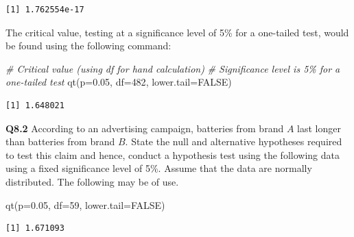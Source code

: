 \documentclass[
  oneside]{krantz}
\newenvironment{Shaded}{\begin{snugshade}}{\end{snugshade}}
\newcommand{\AttributeTok}[1]{\textcolor[rgb]{0.77,0.63,0.00}{#1}}
\newcommand{\CommentTok}[1]{\textcolor[rgb]{0.56,0.35,0.01}{\textit{#1}}}
\newcommand{\ConstantTok}[1]{\textcolor[rgb]{0.00,0.00,0.00}{#1}}
\newcommand{\DecValTok}[1]{\textcolor[rgb]{0.00,0.00,0.81}{#1}}
\newcommand{\FloatTok}[1]{\textcolor[rgb]{0.00,0.00,0.81}{#1}}
\newcommand{\FunctionTok}[1]{\textcolor[rgb]{0.00,0.00,0.00}{#1}}
\newcommand{\NormalTok}[1]{#1}
\begin{document}
\begin{verbatim}
[1] 1.762554e-17
\end{verbatim}

The critical value, testing at a significance level of 5\% for a one-tailed test, would be found using the following command:

\begin{Shaded}
\begin{Highlighting}[]
\CommentTok{\# Critical value (using df for hand calculation)}
\CommentTok{\# Significance level is 5\% for a one{-}tailed test}
\FunctionTok{qt}\NormalTok{(}\AttributeTok{p=}\FloatTok{0.05}\NormalTok{, }\AttributeTok{df=}\DecValTok{482}\NormalTok{, }\AttributeTok{lower.tail=}\ConstantTok{FALSE}\NormalTok{)}
\end{Highlighting}
\end{Shaded}

\begin{verbatim}
[1] 1.648021
\end{verbatim}

\textbf{Q8.2} According to an advertising campaign, batteries from brand \(A\) last longer than
batteries from brand \(B\). State the null and alternative hypotheses required to test this claim and hence, conduct a hypothesis test using the following data using a fixed significance level of 5\%. Assume that the data are normally distributed. The following may be of use.

\begin{Shaded}
\begin{Highlighting}[]
\FunctionTok{qt}\NormalTok{(}\AttributeTok{p=}\FloatTok{0.05}\NormalTok{, }\AttributeTok{df=}\DecValTok{59}\NormalTok{, }\AttributeTok{lower.tail=}\ConstantTok{FALSE}\NormalTok{)}
\end{Highlighting}
\end{Shaded}

\begin{verbatim}
[1] 1.671093
\end{verbatim}
\end{document}
